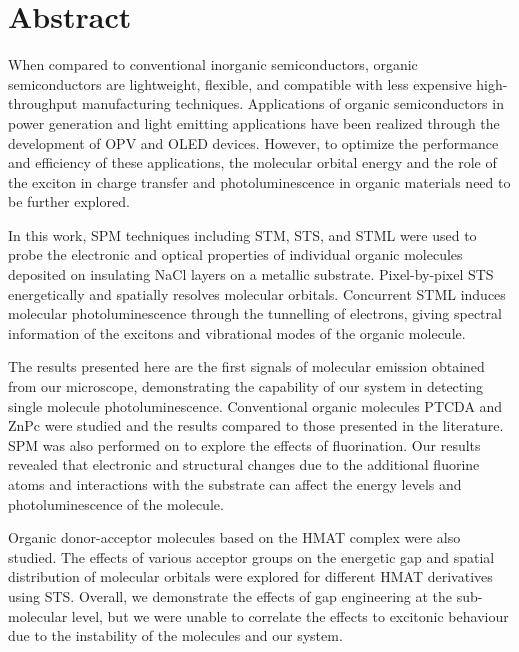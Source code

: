 


\chapter{Abstract}


When compared to conventional inorganic semiconductors, organic semiconductors are lightweight, flexible, and compatible with less expensive high-throughput manufacturing techniques. Applications of organic semiconductors in power generation and light emitting applications have been realized through the development of \ac{OPV} and \ac{OLED} devices. However, to optimize the performance and efficiency of these applications, the molecular orbital energy and the role of the exciton in charge transfer and photoluminescence in organic materials need to be further explored.

In this work, \ac{SPM} techniques including \ac{STM}, \ac{STS}, and \ac{STML} were used to probe the electronic and optical properties of individual organic molecules deposited on insulating NaCl layers on a metallic substrate. Pixel-by-pixel \ac{STS} energetically and spatially resolves molecular orbitals. Concurrent \ac{STML} induces molecular photoluminescence through the tunnelling of electrons, giving spectral information of the excitons and vibrational modes of the organic molecule. 

\sloppy The results presented here are the first signals of molecular emission obtained from our microscope, demonstrating the capability of our system in detecting single molecule photoluminescence.  Conventional organic molecules \ac{PTCDA} and \ac{ZnPc} were studied and the results compared to those presented in the literature. \ac{SPM} was also performed on  to explore the effects of fluorination. Our results revealed that electronic and structural changes due to the additional fluorine atoms and interactions with the substrate can affect the energy levels and photoluminescence of the molecule.

\sloppy Organic donor-acceptor molecules based on the \ac{HMAT} complex were also studied. The effects of various acceptor groups on the energetic gap and spatial distribution of molecular orbitals were explored for different \ac{HMAT} derivatives using \ac{STS}. Overall, we demonstrate the effects of gap engineering at the sub-molecular level, but we were unable to correlate the effects to excitonic behaviour due to the instability of the molecules and our system.









\vfill
\begin{center}
\begin{sf}
\end{sf}
\end{center}

